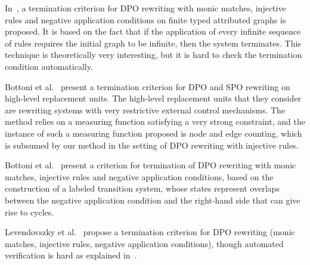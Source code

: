 In~\cite{levendovszky2007termination}, a termination criterion for DPO rewriting with monic matches, injective rules and negative application conditions on finite typed attributed graphs is proposed. It is based on the fact that if the application of every infinite sequence of rules requires the initial graph to be infinite, then the system terminates. This technique is theoretically very interesting, but it is hard to check the termination condition automatically.

Bottoni et al.~\cite{bottoni2005termination} present a termination criterion for DPO and SPO rewriting on high-level replacement units. The high-level replacement units that they consider are rewriting systems with very restrictive external control mechanisms.  The method relies on a measuring function satisfying a very strong constraint, and the instance of such a measuring function proposed is node and edge counting, which is subsumed by our method in the setting of DPO rewriting with injective rules.

Bottoni et al.~\cite{bottoni2010atermination} present a criterion for termination of DPO rewriting with monic matches, injective rules and negative application conditions, based on the construction of a labeled transition system,
whose states represent overlaps between the negative application condition and the right-hand side that can give rise to cycles.

Levendovszky et al.~\cite{levendovszky2007termination} propose a termination criterion for DPO rewriting (monic matches, injective rules, negative application conditions), though automated verification is hard as explained in~\cite[]{levendovszky2007termination}. 





